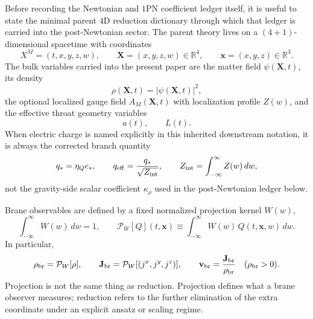 \documentclass[11pt]{article}
\begin{document}
Before recording the Newtonian and $1$PN coefficient ledger itself, it is useful
 to state the minimal parent $4$D reduction dictionary through which that ledger
 is carried into the post-Newtonian sector.  The parent theory lives on a
 $(4+1)$-dimensional spacetime with coordinates
\[
X^M=(t,x,y,z,w),
\qquad
\mathbf{X}=(x,y,z,w)\in\mathbb R^4,
\qquad
\mathbf{x}=(x,y,z)\in\mathbb R^3.
\]
The bulk variables carried into the present paper are the matter field
 $\psi(\mathbf X,t)$, its density
\[
\rho(\mathbf X,t)=|\psi(\mathbf X,t)|^2,
\]
the optional localized gauge field $A_M(\mathbf X,t)$ with localization profile
 $Z(w)$, and the effective throat geometry variables
\[
a(t),\qquad L(t).
\]
When electric charge is named explicitly in this inherited downstream notation,
 it is always the corrected branch quantity
\[
q_*=\eta_Q e_*,
\qquad
q_{\rm eff}=\frac{q_*}{\sqrt{Z_{\rm int}}},
\qquad
Z_{\rm int}=\int_{-\infty}^{\infty} Z(w)\,dw,
\]
not the gravity-side scalar coefficient $\kappa_\rho$ used in the post-Newtonian
 ledger below.

Brane observables are defined by a fixed normalized projection kernel $W(w)$,
\[
\int_{-\infty}^{\infty} W(w)\,dw = 1,
\qquad
\mathcal P_W[Q](t,\mathbf x)
\equiv
\int_{-\infty}^{\infty} W(w)\,Q(t,\mathbf x,w)\,dw.
\]
In particular,
\[
\rho_{\rm br}=\mathcal P_W[\rho],
\qquad
\mathbf J_{\rm br}=\mathcal P_W[(j^x,j^y,j^z)],
\qquad
\mathbf v_{\rm br}=\frac{\mathbf J_{\rm br}}{\rho_{\rm br}}
\quad (\rho_{\rm br}>0).
\]
Projection is not the same thing as reduction.  Projection defines what a brane
 observer measures; reduction refers to the further elimination of the extra
 coordinate under an explicit ansatz or scaling regime.
\end{document}
